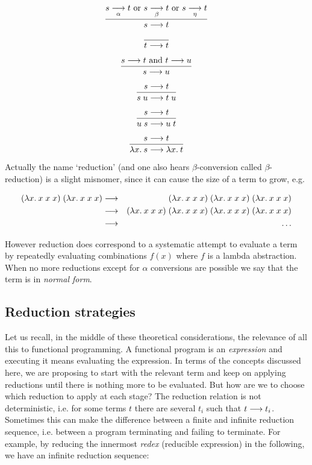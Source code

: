 $$ \frac{s \mathrel{\mathop{\longrightarrow}\limits_{\alpha}} t \mbox{ or } s \mathrel{\mathop{\longrightarrow}\limits_{\beta}} t \mbox{ or } s \mathrel{\mathop{\longrightarrow}\limits_{\eta}} t}
        {s \longrightarrow t} $$

$$ \frac{}{t \longrightarrow t} $$

$$ \frac{s \longrightarrow t \mbox{ and } t \longrightarrow u}{s \longrightarrow u} $$

$$ \frac{s \longrightarrow t}{s\; u \longrightarrow t\; u} $$

$$ \frac{s \longrightarrow t}{u\; s \longrightarrow u\; t} $$

$$ \frac{s \longrightarrow t}{\lambda x.\: s \longrightarrow \lambda x.\: t}$$

Actually the name `reduction' (and one also hears $\beta$-conversion called
$\beta$-reduction) is a slight misnomer, since it can cause the size of a term
to grow, e.g.

\begin{eqnarray*}
(\lambda x.\: x\; x\; x)\; (\lambda x.\: x\; x\; x)
& \longrightarrow & (\lambda x.\: x\; x\; x)\; (\lambda x.\: x\; x\; x)\;
(\lambda x.\: x\; x\; x) \\
& \longrightarrow & (\lambda x.\: x\; x\; x)\; (\lambda x.\: x\; x\; x)\; (\lambda x.\: x\; x\;
x)\; (\lambda x.\: x\; x\; x) \\ & \longrightarrow & \ldots
\end{eqnarray*}

However reduction does correspond to a systematic attempt to evaluate a
term by repeatedly evaluating combinations $f(x)$ where $f$ is a lambda
abstraction. When no more reductions except for $\alpha$ conversions are
possible we say that the term is in {\em normal form}.

\subsection{Reduction strategies}

Let us recall, in the middle of these theoretical considerations, the relevance
of all this to functional programming. A functional program is an {\em
expression} and executing it means evaluating the expression. In terms of the
concepts discussed here, we are proposing to start with the relevant term and
keep on applying reductions until there is nothing more to be evaluated. But
how are we to choose which reduction to apply at each stage? The reduction
relation is not deterministic, i.e. for some terms $t$ there are several $t_i$
such that $t \longrightarrow t_i$. Sometimes this can make the difference between a
finite and infinite reduction sequence, i.e. between a program terminating and
failing to terminate. For example, by reducing the innermost {\em redex}
(reducible expression) in the following, we have an infinite reduction
sequence:

